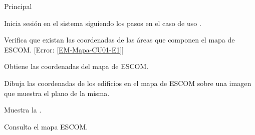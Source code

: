 \begin{UCtrayectoria}{Principal}

	\UCpaso[\UCactor] Inicia sesión en el sistema siguiendo los pasos en el caso de uso .

	\UCpaso Verifica que existan las coordenadas de las áreas que componen el mapa de ESCOM. [Error: \ref{EM-Mapa-CU01-E1}]

	\UCpaso Obtiene las coordenadas del mapa de ESCOM.

	\UCpaso Dibuja las coordenadas de los edificios en el mapa de ESCOM sobre una imagen que muestra el plano de la misma.

	\UCpaso Muestra la .

	\UCpaso[\UCactor] Consulta el mapa ESCOM. \label{CU04ConsultarOtros}

\end{UCtrayectoria}





%
%















